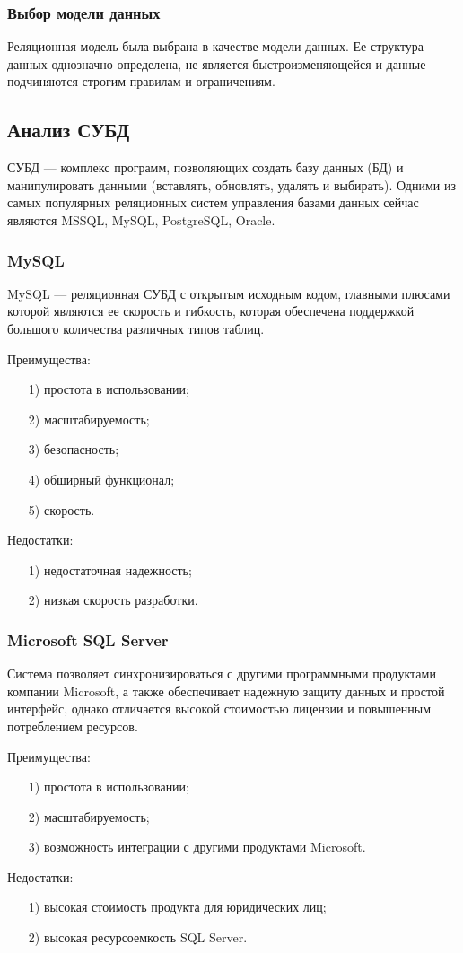 \subsubsection{Выбор модели данных}
 Реляционная модель была выбрана в качестве модели данных. Ее структура данных однозначно определена, не является быстроизменяющейся и данные подчиняются строгим правилам и ограничениям.
\subsection{Анализ СУБД}
СУБД — комплекс программ, позволяющих создать базу данных (БД) и манипулировать данными (вставлять, обновлять, удалять и выбирать). Одними из самых популярных реляционных систем управления базами данных сейчас являются MSSQL, MySQL, PostgreSQL, Oracle.
\subsubsection{MySQL}
MySQL — реляционная СУБД с открытым исходным кодом, главными плюсами которой являются ее скорость и гибкость, которая обеспечена поддержкой большого количества различных типов таблиц.

Преимущества:
\begin{itemize}
	\item[1)] простота в использовании;
	\item[2)] масштабируемость;
	\item[3)] безопасность;
	\item[4)] обширный функционал;
	\item[5)] скорость.    
\end{itemize}
Недостатки:
\begin{itemize}
	\item[1)] недостаточная надежность;
	\item[2)] низкая скорость разработки. 
\end{itemize}
\subsubsection{Microsoft SQL Server}
Система позволяет синхронизироваться с другими программными продуктами компании Microsoft, а также обеспечивает надежную защиту данных и простой интерфейс, однако отличается высокой стоимостью лицензии и повышенным потреблением ресурсов.

Преимущества:
\begin{itemize}
	\item[1)] простота в использовании;
	\item[2)] масштабируемость;
	\item[3)] возможность интеграции с другими продуктами Microsoft.  
\end{itemize}
Недостатки:
\begin{itemize}
	\item[1)] высокая стоимость продукта для юридических лиц; 
	\item[2)] высокая ресурсоемкость SQL Server.  
\end{itemize}
